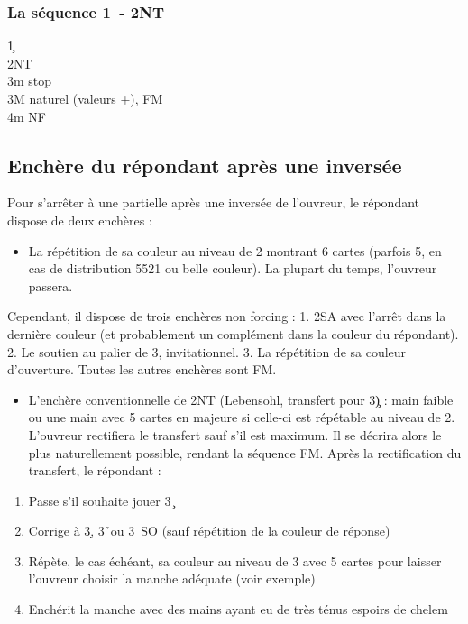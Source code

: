 \documentclass[a4paper]{article}
\begin{document}
\subsubsection{La séquence 1\pdfc\ - 2NT}

\begin{bidtable}
1\c\+\\
2NT\+\\
3m \> stop\\
3M \> naturel (valeurs +), FM\\
4m \> NF\-\-
\end{bidtable}

\subsection{Enchère du répondant après une inversée}

Pour s'arrêter à une partielle après une inversée de l'ouvreur, le répondant dispose de deux enchères :

\begin{itemize}
\item La répétition de sa couleur au niveau de 2 montrant 6 cartes (parfois 5, en cas de distribution 5521 ou belle couleur).
  La plupart du temps, l'ouvreur passera.

\end{itemize}

Cependant, il dispose de trois enchères non forcing :
1. 2SA avec l'arrêt dans la dernière couleur (et probablement un complément dans la couleur du répondant).
2. Le soutien au palier de 3, invitationnel.
3. La répétition de sa couleur d'ouverture.
Toutes les autres enchères sont FM.

\begin{itemize}
\item L'enchère conventionnelle de 2NT (Lebensohl, transfert pour 3\c ) : main faible ou une main avec 5 cartes en majeure si celle-ci est répétable au niveau de 2.
L'ouvreur rectifiera le transfert sauf s'il est maximum. Il se décrira alors le plus naturellement possible, rendant la séquence FM.
Après la rectification du transfert, le répondant :

\end{itemize}

\begin{enumerate}
\item Passe s'il souhaite jouer 3\c\ 

\item Corrige à 3\d , 3\h\ ou 3\s\ SO (sauf répétition de la couleur de réponse)

\item Répète, le cas échéant, sa couleur au niveau de 3 avec 5 cartes pour laisser l'ouvreur choisir la manche adéquate (voir exemple)

\item Enchérit la manche avec des mains ayant eu de très ténus espoirs de chelem

\end{enumerate}
\end{document}
